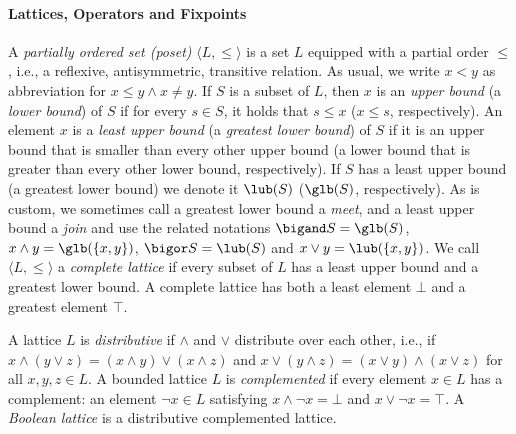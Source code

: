 \paragraph{Lattices, Operators and Fixpoints}
A \emph{partially ordered set (poset)} $\langle L,\leq\rangle$ is a set $L$ equipped with a partial order $\leq$, i.e., a reflexive, antisymmetric, transitive relation. 
As usual, we write $x<y$ as abbreviation for $x\leq y \land x\neq y$.
If $S$ is a subset of $L$, then $x$ is an \emph{upper bound} (a \emph{lower bound}) of $S$ if for every $s\in S$, it holds that $s\leq x$ ($x\leq s$, respectively).
An element $x$ is a \emph{least upper bound} (a \emph{greatest lower bound}) of $S$ if it is an upper bound that is smaller than every other upper bound (a lower bound that is greater than every other lower bound, respectively).
If $S$ has a least upper bound (a greatest lower bound) we denote it $\lub(S)$ ($\glb(S)$, respectively).
As is custom, we sometimes call a greatest lower bound a \emph{meet}, and a least upper bound a \emph{join} and use the related notations $\bigand S = \glb(S)$, $x\land y=\glb(\{x,y\})$, $\bigor S = \lub(S)$ and $x\lor y=\lub(\{x,y\})$.
 We call $\langle L,\leq\rangle$ a \emph{complete lattice}  if every subset of $L$ has a least upper bound and a greatest lower bound. 
A complete lattice has both a least element $\bot$ and a greatest element $\top$. 

A lattice $L$ is \emph{distributive} if $\land$ and $\lor$ distribute over each other, i.e., if $x\land(y\lor z)=(x\land y)\lor(x\land z)$ and $x\lor(y\land z)=(x\lor y)\land(x\lor z)$ for all $x,y,z\in L$.
A bounded lattice $L$ is \emph{complemented} if every element $x\in L$ has a complement: an element $\lnot x \in L$
satisfying $x\land \lnot x = \bot $ and $x\lor \lnot x = \top$. A \emph{Boolean lattice} is a distributive
complemented lattice.

